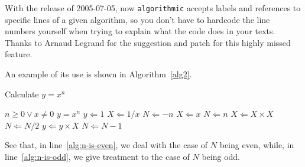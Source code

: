 \documentclass{article}
\newcommand{\keyword}[1]{\texttt{#1}}
\begin{document}
With the release of 2005-07-05, now \keyword{algorithmic} accepts labels
and references to specific lines of a given algorithm, so you don't have to
hardcode the line numbers yourself when trying to explain what the code
does in your texts.  Thanks to Arnaud Legrand for the suggestion and patch
for this highly missed feature.

An example of its use is shown in Algorithm~\ref{alg2}.
\begin{algorithm}[h!]
\caption{Calculate $y = x^n$}
\label{alg2}
\begin{algorithmic}[1]
\REQUIRE $n \geq 0 \vee x \neq 0$
\ENSURE $y = x^n$
\STATE $y \Leftarrow 1$
\STATE $X \Leftarrow 1 / x$
\STATE $N \Leftarrow -n$
\ELSE
\STATE $X \Leftarrow x$
\STATE $N \Leftarrow n$
\ENDIF
{}
\label{alg:n-is-even}
\STATE $X \Leftarrow X \times X$
\STATE $N \Leftarrow N / 2$
\ELSE\label{alg:n-is-odd}
\STATE $y \Leftarrow y \times X$
\STATE $N \Leftarrow N - 1$
\ENDIF
\ENDWHILE
\end{algorithmic}
\end{algorithm}
See that, in line~\ref{alg:n-is-even}, we deal with the case of $N$ being
even, while, in line~\ref{alg:n-is-odd}, we give treatment to the case of
$N$ being odd.
\end{document}
